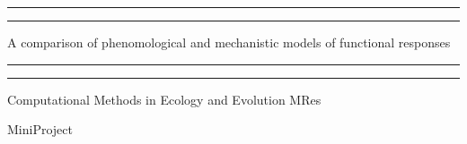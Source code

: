 \documentclass[11pt, a4paper, titlepage]{article}
\begin{document}
	
\begin{titlepage} %
	
	\centering %
	
	\scshape %
	
	\vspace*{\baselineskip} %
	
	
	
	
	\rule{\textwidth}{1.6pt}\vspace*{-\baselineskip}\vspace*{2pt} %
	
	\rule{\textwidth}{0.4pt} %
	
	\vspace{0.75\baselineskip} %
	
	{\LARGE A comparison of phenomological and mechanistic models of functional responses \\} %
	
	\vspace{0.75\baselineskip} %
	
	\rule{\textwidth}{0.4pt}\vspace*{-\baselineskip}\vspace{3.2pt} %
	
	\rule{\textwidth}{1.6pt} %
	
	\vspace{2\baselineskip} %
	
	
	
	
	Computational Methods in Ecology and Evolution MRes
	\vspace{0.5\baselineskip}
	
	 MiniProject %
	
	\vspace*{3\baselineskip} %
	
	

\end{titlepage}
\end{document}
